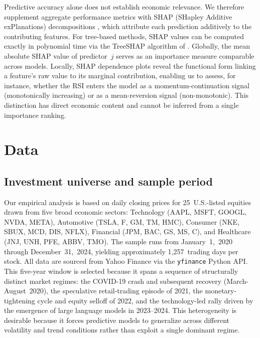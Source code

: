 \documentclass{rQUF2e}
\begin{document}
Predictive accuracy alone does not establish economic relevance. We therefore supplement aggregate performance metrics with SHAP (SHapley Additive exPlanations) decompositions \citep{lundberg2017unified}, which attribute each prediction additively to the contributing features. For tree-based methods, SHAP values can be computed exactly in polynomial time via the TreeSHAP algorithm of \citet{lundberg2020local}. Globally, the mean absolute SHAP value of predictor~$j$ serves as an importance measure comparable across models. Locally, SHAP dependence plots reveal the functional form linking a feature's raw value to its marginal contribution, enabling us to assess, for instance, whether the RSI enters the model as a momentum-continuation signal (monotonically increasing) or as a mean-reversion signal (non-monotonic). This distinction has direct economic content and cannot be inferred from a single importance ranking.



\section{Data}
\label{sec:data}

\subsection{Investment universe and sample period}

Our empirical analysis is based on daily closing prices for 25~U.S.-listed equities drawn from five broad economic sectors: Technology (AAPL, MSFT, GOOGL, NVDA, META), Automotive (TSLA, F, GM, TM, HMC), Consumer (NKE, SBUX, MCD, DIS, NFLX), Financial (JPM, BAC, GS, MS, C), and Healthcare (JNJ, UNH, PFE, ABBV, TMO). The sample runs from January~1,~2020 through December~31,~2024, yielding approximately 1{,}257~trading days per stock. All data are sourced from Yahoo Finance via the \texttt{yfinance} Python API. \\

\noindent This five-year window is selected because it spans a sequence of structurally distinct market regimes: the COVID-19 crash and subsequent recovery (March-August~2020), the speculative retail-trading episode of 2021, the monetary-tightening cycle and equity selloff of 2022, and the technology-led rally driven by the emergence of large language models in 2023--2024. This heterogeneity is desirable because it forces predictive models to generalize across different volatility and trend conditions rather than exploit a single dominant regime. \\
\end{document}
